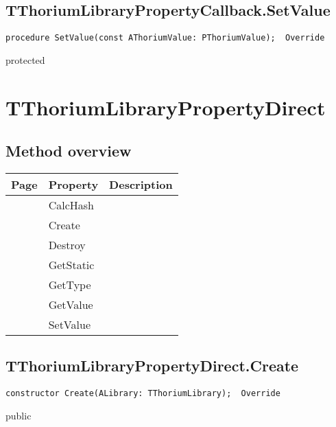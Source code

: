 \subsection{TThoriumLibraryPropertyCallback.SetValue}
\label{thoriumcore:thorium:tthoriumlibrarypropertycallback:setvalue}
\begin{FPCList}
\Synopsis
\Declaration 

\begin{verbatim}
procedure SetValue(const AThoriumValue: PThoriumValue);  Override
\end{verbatim}
\Visibility
protected
\Description
\Errors
\end{FPCList}
\section{TThoriumLibraryPropertyDirect}
\label{thoriumcore:thorium:tthoriumlibrarypropertydirect}
\subsection{Method overview}
\label{thoriumcore:thorium:tthoriumlibrarypropertydirect:methods}
\begin{tabularx}{\textwidth}{llX}
Page & Property & Description  \\ \hline
\pageref{thoriumcore:thorium:tthoriumlibrarypropertydirect:calchash} & CalcHash  &  \\
\pageref{thoriumcore:thorium:tthoriumlibrarypropertydirect:create} & Create  &  \\
\pageref{thoriumcore:thorium:tthoriumlibrarypropertydirect:destroy} & Destroy  &  \\
\pageref{thoriumcore:thorium:tthoriumlibrarypropertydirect:getstatic} & GetStatic  &  \\
\pageref{thoriumcore:thorium:tthoriumlibrarypropertydirect:gettype} & GetType  &  \\
\pageref{thoriumcore:thorium:tthoriumlibrarypropertydirect:getvalue} & GetValue  &  \\
\pageref{thoriumcore:thorium:tthoriumlibrarypropertydirect:setvalue} & SetValue  &  \\
\hline
\end{tabularx}
\subsection{TThoriumLibraryPropertyDirect.Create}
\label{thoriumcore:thorium:tthoriumlibrarypropertydirect:create}
\begin{FPCList}
\Synopsis
\Declaration 

\begin{verbatim}
constructor Create(ALibrary: TThoriumLibrary);  Override
\end{verbatim}
\Visibility
public
\Description
\Errors
\end{FPCList}
